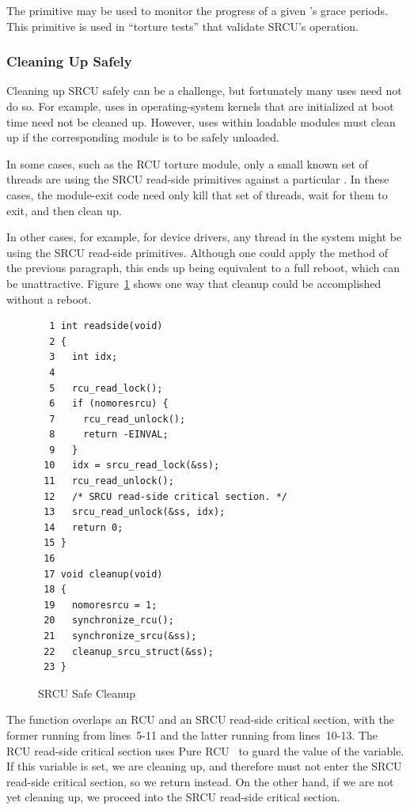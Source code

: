 The  primitive may be used to
monitor the progress of a given  's
grace periods.
This primitive is used in ``torture tests'' that validate SRCU's operation.

\subsubsection{Cleaning Up Safely}
\label{sec:app:rcuimpl:Cleaning Up Safely}

Cleaning up SRCU safely can be a challenge, but fortunately many
uses need not do so.
For example, uses in operating-system kernels that are initialized at
boot time need not be cleaned up.
However, uses within loadable modules must clean up if the corresponding
module is to be safely unloaded.

In some cases, such as the RCU torture module,
only a small known set of threads are using the
SRCU read-side primitives against a particular  .
In these cases, the module-exit code need only kill that set of threads,
wait for them to exit, and then clean up.

In other cases, for example, for device drivers, any thread in the
system might be using the SRCU read-side primitives.
Although one could apply the method of the previous paragraph, this
ends up being equivalent to a full reboot, which can be unattractive.
Figure~\ref{fig:app:rcuimpl:SRCU Safe Cleanup} shows one way that cleanup
could be accomplished without a reboot.

\begin{figure}[htbp]
{ \scriptsize
\begin{verbatim}
  1 int readside(void)
  2 {
  3   int idx;
  4
  5   rcu_read_lock();
  6   if (nomoresrcu) {
  7     rcu_read_unlock();
  8     return -EINVAL;
  9   }
 10   idx = srcu_read_lock(&ss);
 11   rcu_read_unlock();
 12   /* SRCU read-side critical section. */
 13   srcu_read_unlock(&ss, idx);
 14   return 0;
 15 }
 16
 17 void cleanup(void)
 18 {
 19   nomoresrcu = 1;
 20   synchronize_rcu();
 21   synchronize_srcu(&ss);
 22   cleanup_srcu_struct(&ss);
 23 }
\end{verbatim}
}
\caption{SRCU Safe Cleanup}
\label{fig:app:rcuimpl:SRCU Safe Cleanup}
\end{figure}

The  function overlaps an RCU and an SRCU read-side
critical section, with the former running from lines~5-11 and the
latter running from lines~10-13.
The RCU read-side critical section uses Pure
%
%
RCU~\cite{PaulEdwardMcKenneyPhD}
%
to guard the
value of the  variable.
If this variable is set, we are cleaning up, and therefore must not enter
the SRCU read-side critical section, so we return  instead.
On the other hand, if we are not yet cleaning up, we proceed into the
SRCU read-side critical section.

